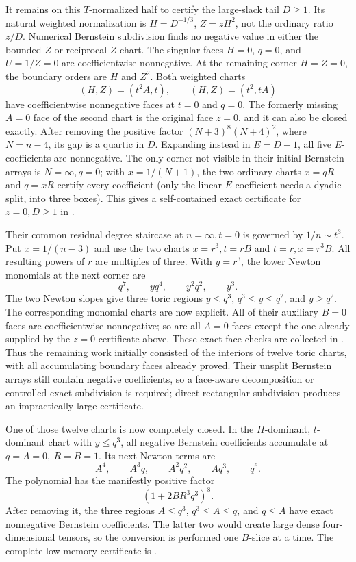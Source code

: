 \documentclass[11pt]{article}
\theoremstyle{remark}
\begin{document}
It remains on this \(T\)-normalized half to certify the large-slack tail
\(D\geq1\).  Its natural weighted normalization is
\(H=D^{-1/3}\), \(Z=zH^2\), not the ordinary ratio \(z/D\).  Numerical
Bernstein subdivision finds no negative value in either the bounded-\(Z\) or
reciprocal-\(Z\) chart.  The singular faces \(H=0\), \(q=0\), and
\(U=1/Z=0\) are coefficientwise nonnegative.  At the remaining corner
\(H=Z=0\), the boundary orders are \(H\) and \(Z^2\).  Both weighted charts
\[
 (H,Z)=(t^2A,t),\qquad (H,Z)=(t^2,tA)
\]
have coefficientwise nonnegative faces at \(t=0\) and \(q=0\).  The formerly
missing \(A=0\) face of the second chart is the original face \(z=0\), and it
can also be closed exactly.  After removing the positive factor
\((N+3)^8(N+4)^2\), where \(N=n-4\), its gap is a quartic in \(D\).  Expanding
instead in \(E=D-1\), all five \(E\)-coefficients are nonnegative.  The only
corner not visible in their initial Bernstein arrays is
\(N=\infty,q=0\); with \(x=1/(N+1)\), the two ordinary charts \(x=qR\) and
\(q=xR\) certify every coefficient (only the linear \(E\)-coefficient needs
a dyadic split, into three boxes).  This gives a self-contained exact
certificate for \(z=0,D\geq1\) in
.

Their common residual degree staircase at
\(n=\infty,t=0\) is governed by \(1/n\sim t^3\).  Put \(x=1/(n-3)\) and use
the two charts \(x=r^3,t=rB\) and \(t=r,x=r^3B\).  All resulting powers of
\(r\) are multiples of three.  With \(y=r^3\), the lower Newton monomials at
the next corner are
\[
 q^7,\qquad yq^4,\qquad y^2q^2,\qquad y^3.
\]
The two Newton slopes give three toric regions \(y\leq q^3\),
\(q^3\leq y\leq q^2\), and \(y\geq q^2\).  The corresponding monomial charts
are now explicit.  All of their auxiliary \(B=0\) faces are coefficientwise
nonnegative; so are all \(A=0\) faces except the one already supplied by the
\(z=0\) certificate above.  These exact face checks are collected in
.  Thus the remaining
work initially consisted of the interiors of twelve toric charts, with all accumulating
boundary faces already proved.  Their unsplit Bernstein arrays still contain
negative coefficients, so a face-aware decomposition or controlled exact
subdivision is required; direct rectangular subdivision produces an
impractically large certificate.

One of those twelve charts is now completely closed.  In the
\(H\)-dominant, \(t\)-dominant chart with \(y\leq q^3\), all
negative Bernstein coefficients accumulate at \(q=A=0,\ R=B=1\).  Its next
Newton terms are
\[
 A^4,\qquad A^3q,\qquad A^2q^2,\qquad Aq^3,\qquad q^6.
\]
The polynomial has the manifestly positive factor
\[
              (1+2BR^3q^3)^8.
\]
After removing it, the three regions \(A\leq q^3\),
\(q^3\leq A\leq q\), and \(q\leq A\) have exact nonnegative Bernstein
coefficients.  The latter two would create large dense four-dimensional
tensors, so the conversion is performed one \(B\)-slice at a time.  The
complete low-memory certificate is
.
\end{document}
